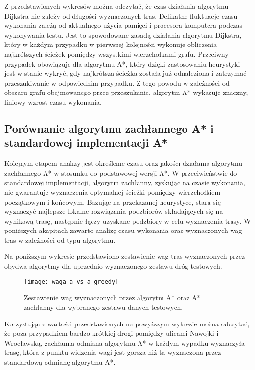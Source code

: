 Z przedstawionych wykresów można odczytać, że czas działania algorytmu Dijkstra nie zależy od długości wyznaczonych tras. Delikatne fluktuacje czasu wykonania zależą od aktualnego użycia pamięci i procesora komputera podczas wykonywania testu. Jest to spowodowane zasadą działania algorytmu Dijkstra, który w każdym przypadku w pierwszej kolejności wykonuje obliczenia najkrótszych ścieżek pomiędzy wszystkimi wierzchołkami grafu.
Przeciwny przypadek obowiązuje dla algorytmu A*, który dzięki zastosowaniu heurystyki jest w stanie wykryć, gdy najkrótsza ścieżka została już odnaleziona i zatrzymać przeszukiwanie w odpowiednim przypadku. Z tego powodu w zależności od obszaru grafu obejmowanego przez przeszukanie, algorytm A* wykazuje znaczny, liniowy wzrost czasu wykonania.

\subsection{Porównanie algorytmu zachłannego A* i standardowej implementacji A*}

Kolejnym etapem analizy jest określenie czasu oraz jakości działania algorytmu zachłannego A* w stosunku do podstawowej wersji A*. W przeciwieństwie do standardowej implementacji, algorytm zachłanny, zyskując na czasie wykonania, nie gwarantuje wyznaczenia optymalnej ścieżki pomiędzy wierzchołkiem początkowym i końcowym. Bazując na przekazanej heurystyce, stara się wyznaczyć najlepsze lokalne rozwiązania podzbiorów składających się na wynikową trasę, następnie łączy uzyskane podzbiory w celu wyznaczenia trasy. W poniższych akapitach zawarto analizę czasu wykonania oraz wyznaczonych wag tras w zależności od typu algorytmu.

Na poniższym wykresie przedstawiono zestawienie wag tras wyznaczonych przez obydwa algorytmy dla uprzednio wyznaczonego zestawu dróg testowych.

\begin{figure}[H]
\centering
\texttt{[image: waga\_a\_vs\_a\_greedy]}
\caption{Zestawienie wag wyznaczonych przez algorytm A* oraz A* zachłanny dla wybranego zestawu danych testowych.}
\end{figure}

Korzystając z wartości przedstawionych na powyższym wykresie można odczytać, że poza przypadkiem bardzo krótkiej drogi pomiędzy ulicami Nawojki i Wrocławską, zachłanna odmiana algorytmu A* w każdym wypadku wyznaczyła trasę, która z punktu widzenia wagi jest gorsza niż ta wyznaczona przez standardową odmianę algorytmu A*.

